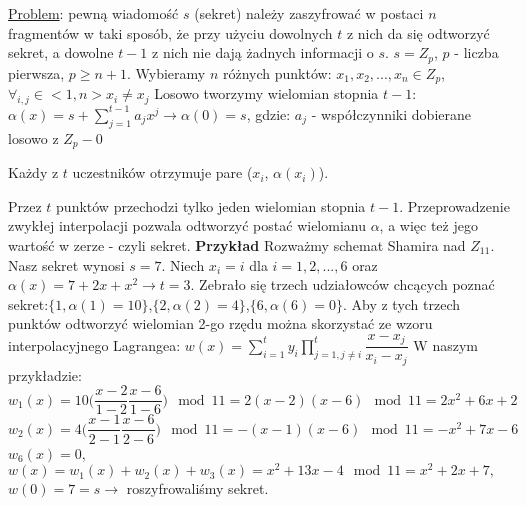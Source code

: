 \underline{Problem}: pewną wiadomość $ s $ (sekret) należy zaszyfrować w postaci $ n $ fragmentów w taki sposób, że przy użyciu dowolnych $ t $ z nich da się odtworzyć sekret, a dowolne $ t - 1 $ z nich nie dają żadnych informacji o $ s $.\newline
$ s = Z_p $, $ p $ - liczba pierwsza, $ p \ge n + 1 $.\newline
Wybieramy $ n $ różnych punktów: $ x_1, x_2,..., x_n \in Z_p $, $ \forall_{i,j}\in<1,n> x_i \neq x_j $\newline
Losowo tworzymy wielomian stopnia $ t-1 $:\newline
$ \alpha (x) = s + \sum\limits_{j=1}^{t-1}a_jx^j \rightarrow \alpha(0) = s $, gdzie:\newline
$ a_j $ - współczynniki dobierane losowo z $ Z_p - {0} $

Każdy z $ t $ uczestników otrzymuje pare ($ x_i $, $ \alpha(x_i) $).

Przez $ t $ punktów przechodzi tylko jeden wielomian stopnia $ t-1 $. Przeprowadzenie zwykłej interpolacji pozwala odtworzyć postać wielomianu $ \alpha $, a więc też jego wartość w zerze - czyli sekret.\newline
\textbf{Przykład}\newline
Rozważmy schemat Shamira nad $ Z_{11} $. Nasz sekret wynosi $ s = 7 $. Niech $ x_i = i $ dla $ i = 1,2,...,6 $ oraz $ \alpha(x) = 7 + 2x + x^2 \rightarrow t = 3 $. Zebrało się trzech udziałowców chcących poznać sekret:\newline $ \{1, \alpha(1) = 10\} $,\newline $ \{2, \alpha(2) = 4\} $,\newline $ \{6, \alpha(6) = 0\} $.\newline
Aby z tych trzech punktów odtworzyć wielomian 2-go rzędu można skorzystać ze wzoru interpolacyjnego Lagrangea:\newline
$ w(x) = \sum\limits_{i=1}^t y_i \prod\limits_{j=1,j\ne i}^t \dfrac{x-x_j}{x_i-x_j} $\newline
W naszym przykładzie:\newline
$ w_1(x) = 10\big( \dfrac{x-2}{1-2}\dfrac{x-6}{1-6} \big) \mod 11 = 2(x-2)(x-6) \mod 11 = 2x^2 + 6x + 2$\newline
$ w_2(x) = 4\big( \dfrac{x-1}{2-1}\dfrac{x-6}{2-6} \big) \mod 11 = -(x-1)(x-6) \mod 11 = -x^2 +7x - 6 $\newline
$ w_6(x) = 0 $,\newline
$ w(x) = w_1(x) + w_2(x) + w_3(x) = x^2 + 13x - 4 \mod 11 = x^2 + 2x + 7, $
$ w(0) = 7 = s \rightarrow $ roszyfrowaliśmy sekret.
